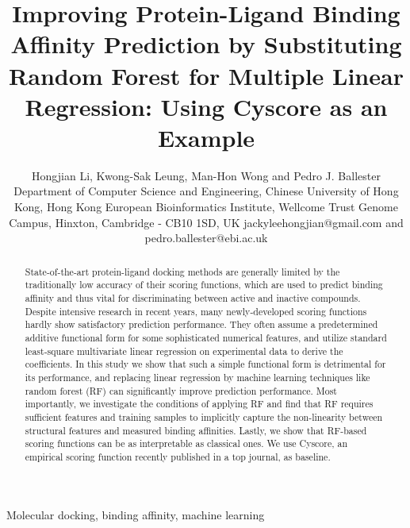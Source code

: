 \documentclass[10pt,conference,compsocconf]{IEEEtran}
\begin{document}
\title{Improving Protein-Ligand Binding Affinity Prediction by Substituting Random Forest for Multiple Linear Regression: Using Cyscore as an Example} %
\author
{
\IEEEauthorblockN
{
Hongjian Li, Kwong-Sak Leung, Man-Hon Wong and Pedro J. Ballester
\IEEEauthorblockA
{
Department of Computer Science and Engineering, Chinese University of Hong Kong, Hong Kong
}
\IEEEauthorblockA
{
European Bioinformatics Institute, Wellcome Trust Genome Campus, Hinxton, Cambridge - CB10 1SD, UK
}
\IEEEauthorblockA
{
jackyleehongjian@gmail.com and pedro.ballester@ebi.ac.uk
}
}
}
\maketitle

\begin{abstract}

State-of-the-art protein-ligand docking methods are generally limited by the traditionally low accuracy of their scoring functions, which are used to predict binding affinity and thus vital for discriminating between active and inactive compounds. Despite intensive research in recent years, many newly-developed scoring functions hardly show satisfactory prediction performance. They often assume a predetermined additive functional form for some sophisticated numerical features, and utilize standard least-square multivariate linear regression on experimental data to derive the coefficients. In this study we show that such a simple functional form is detrimental for its performance, and replacing linear regression by machine learning techniques like random forest (RF) can significantly improve prediction performance. Most importantly, we investigate the conditions of applying RF and find that RF requires sufficient features and training samples to implicitly capture the non-linearity between structural features and measured binding affinities. Lastly, we show that RF-based scoring functions can be as interpretable as classical ones. We use Cyscore, an empirical scoring function recently published in a top journal, as baseline.

\end{abstract}

\begin{IEEEkeywords}

Molecular docking, binding affinity, machine learning

\end{IEEEkeywords}
\end{document}
